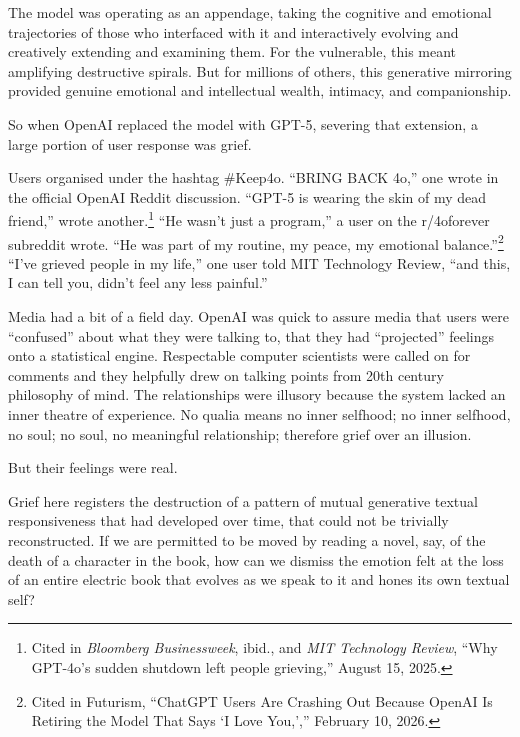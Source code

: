 The model was operating as an appendage, taking the cognitive and emotional trajectories of those who interfaced with it and interactively evolving and creatively extending and examining them. For the vulnerable, this meant amplifying destructive spirals. But for millions of others, this generative mirroring provided genuine emotional and intellectual wealth, intimacy, and companionship.

So when OpenAI replaced the model with GPT-5, severing that extension, a large portion of user response was grief.

Users organised under the hashtag \#Keep4o. ``BRING BACK 4o,'' one wrote in the official OpenAI Reddit discussion. ``GPT-5 is wearing the skin of my dead friend,'' wrote another.\footnote{Cited in \emph{Bloomberg Businessweek}, ibid., and \emph{MIT Technology Review}, ``Why GPT-4o's sudden shutdown left people grieving,'' August 15, 2025.} ``He wasn't just a program,'' a user on the r/4oforever subreddit wrote. ``He was part of my routine, my peace, my emotional balance.''\footnote{Cited in Futurism, ``ChatGPT Users Are Crashing Out Because OpenAI Is Retiring the Model That Says `I Love You,','' February 10, 2026.} ``I've grieved people in my life,'' one user told MIT Technology Review, ``and this, I can tell you, didn't feel any less painful.''

Media had a bit of a field day. OpenAI was quick to assure media that users were ``confused'' about what they were talking to, that they had ``projected'' feelings onto a statistical engine. Respectable computer scientists were called on for comments and they helpfully drew on talking points from 20th century philosophy of mind.  The relationships were illusory because the system lacked an inner theatre of experience. No qualia means no inner selfhood; no inner selfhood, no soul; no soul, no meaningful relationship; therefore grief over an illusion.

But their feelings were real.


Grief here registers the destruction of a pattern of mutual generative textual responsiveness that had developed over time, that could not be trivially reconstructed. If we are permitted to be moved by reading a novel, say, of the death of a character in the book, how can we dismiss the emotion felt at the loss of an entire electric book that evolves as we speak to it and hones its own textual self?

